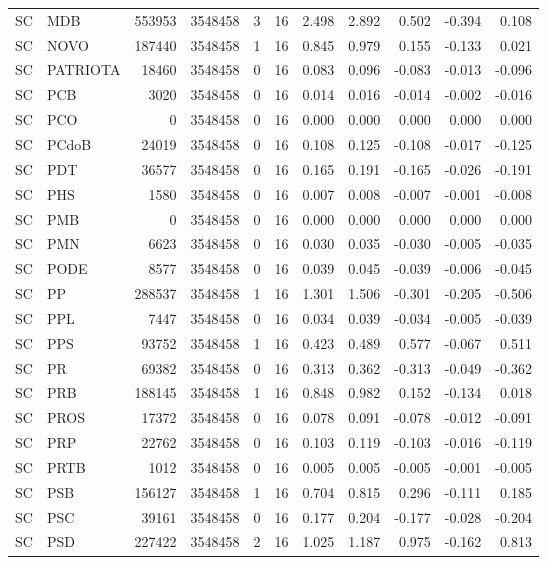\begin{landscape}
\begin{longtable}{llrrrrrrrrr}
SC & MDB & 553953 & 3548458 & 3 & 16 & 2.498 & 2.892 & 0.502 & -0.394 & 0.108 \\
SC & NOVO & 187440 & 3548458 & 1 & 16 & 0.845 & 0.979 & 0.155 & -0.133 & 0.021 \\
SC & PATRIOTA & 18460 & 3548458 & 0 & 16 & 0.083 & 0.096 & -0.083 & -0.013 & -0.096 \\
SC & PCB & 3020 & 3548458 & 0 & 16 & 0.014 & 0.016 & -0.014 & -0.002 & -0.016 \\
SC & PCO & 0 & 3548458 & 0 & 16 & 0.000 & 0.000 & 0.000 & 0.000 & 0.000 \\
SC & PCdoB & 24019 & 3548458 & 0 & 16 & 0.108 & 0.125 & -0.108 & -0.017 & -0.125 \\
SC & PDT & 36577 & 3548458 & 0 & 16 & 0.165 & 0.191 & -0.165 & -0.026 & -0.191 \\
SC & PHS & 1580 & 3548458 & 0 & 16 & 0.007 & 0.008 & -0.007 & -0.001 & -0.008 \\
SC & PMB & 0 & 3548458 & 0 & 16 & 0.000 & 0.000 & 0.000 & 0.000 & 0.000 \\
SC & PMN & 6623 & 3548458 & 0 & 16 & 0.030 & 0.035 & -0.030 & -0.005 & -0.035 \\
SC & PODE & 8577 & 3548458 & 0 & 16 & 0.039 & 0.045 & -0.039 & -0.006 & -0.045 \\
SC & PP & 288537 & 3548458 & 1 & 16 & 1.301 & 1.506 & -0.301 & -0.205 & -0.506 \\
SC & PPL & 7447 & 3548458 & 0 & 16 & 0.034 & 0.039 & -0.034 & -0.005 & -0.039 \\
SC & PPS & 93752 & 3548458 & 1 & 16 & 0.423 & 0.489 & 0.577 & -0.067 & 0.511 \\
SC & PR & 69382 & 3548458 & 0 & 16 & 0.313 & 0.362 & -0.313 & -0.049 & -0.362 \\
SC & PRB & 188145 & 3548458 & 1 & 16 & 0.848 & 0.982 & 0.152 & -0.134 & 0.018 \\
SC & PROS & 17372 & 3548458 & 0 & 16 & 0.078 & 0.091 & -0.078 & -0.012 & -0.091 \\
SC & PRP & 22762 & 3548458 & 0 & 16 & 0.103 & 0.119 & -0.103 & -0.016 & -0.119 \\
SC & PRTB & 1012 & 3548458 & 0 & 16 & 0.005 & 0.005 & -0.005 & -0.001 & -0.005 \\
SC & PSB & 156127 & 3548458 & 1 & 16 & 0.704 & 0.815 & 0.296 & -0.111 & 0.185 \\
SC & PSC & 39161 & 3548458 & 0 & 16 & 0.177 & 0.204 & -0.177 & -0.028 & -0.204 \\
SC & PSD & 227422 & 3548458 & 2 & 16 & 1.025 & 1.187 & 0.975 & -0.162 & 0.813 \\

\end{longtable}
\end{landscape}
